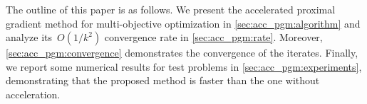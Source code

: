 \documentclass[../main]{subfiles}
\begin{document}
The outline of this paper is as follows.
We present the accelerated proximal gradient method for multi-objective optimization in \cref{sec:acc_pgm:algorithm} and analyze its~$O(1 / k^2)$ convergence rate in \cref{sec:acc_pgm:rate}.
Moreover, \cref{sec:acc_pgm:convergence} demonstrates the convergence of the iterates.
Finally, we report some numerical results for test problems in \cref{sec:acc_pgm:experiments}, demonstrating that the proposed method is faster than the one without acceleration.
\end{document}
